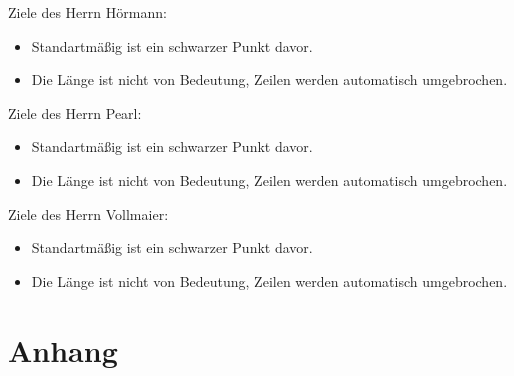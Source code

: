 Ziele des Herrn Hörmann:
\begin{itemize}
    \item Standartmäßig ist ein schwarzer Punkt davor.
    \item Die Länge ist nicht von Bedeutung, Zeilen werden automatisch umgebrochen.
\end{itemize}

\noindent\hrulefill

Ziele des Herrn Pearl:
\begin{itemize}
    \item Standartmäßig ist ein schwarzer Punkt davor.
    \item Die Länge ist nicht von Bedeutung, Zeilen werden automatisch umgebrochen.
\end{itemize}

\noindent\hrulefill

Ziele des Herrn Vollmaier:
\begin{itemize}
    \item Standartmäßig ist ein schwarzer Punkt davor.
    \item Die Länge ist nicht von Bedeutung, Zeilen werden automatisch umgebrochen.
\end{itemize}

\chapter{Anhang}


